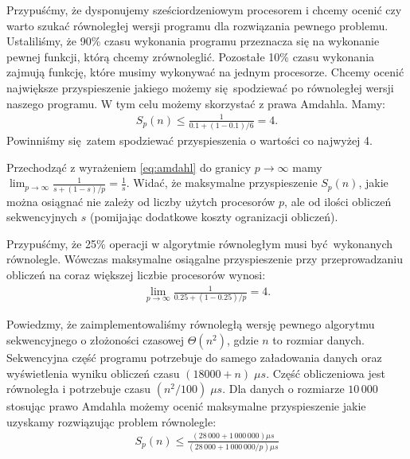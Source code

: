 \begin{przyklad}
Przypuśćmy, że dysponujemy sześciordzeniowym procesorem i chcemy ocenić czy warto szukać równoległej wersji programu dla rozwiązania pewnego problemu. Ustaliliśmy, że 90\% czasu wykonania programu przeznacza się na wykonanie pewnej funkcji, którą chcemy zrównoleglić. Pozostałe 10\% czasu wykonania zajmują funkcję, które musimy wykonywać na jednym procesorze. Chcemy ocenić największe przyspieszenie jakiego możemy się spodziewać po równoległej wersji naszego programu. W tym celu możemy skorzystać z prawa Amdahla. Mamy:
\begin{align*}
S_{p}(n) \leq \frac{1}{0.1 + (1-0.1)/6} = 4.
\end{align*}
\noindent Powinniśmy się zatem spodziewać przyspieszenia o wartości co najwyżej 4.
\end{przyklad}


\begin{wniosek}
Przechodząć z wyrażeniem \eqref{eq:amdahl} do granicy \(p\to\infty\) mamy \(\lim_{p\to\infty}\frac{1}{s+(1-s)/p} = \frac{1}{s}\). Widać, że maksymalne przyspieszenie \(S_{p}(n)\), jakie można osiągnać nie zależy od liczby użytch procesorów \(p\), ale od ilości obliczeń sekwencyjnych \(s\) (pomijając dodatkowe koszty ogranizacji obliczeń).
\end{wniosek}

\begin{przyklad}
Przypuśćmy, że 25\% operacji w algorytmie równoległym musi być wykonanych równolegle. Wówczas maksymalne osiągalne przyspieszenie przy przeprowadzaniu obliczeń na coraz większej liczbie procesorów wynosi:
\begin{align*}
\lim_{p\to \infty} \frac{1}{0.25+(1-0.25)/p} = 4.
\end{align*}
\end{przyklad}

\begin{przyklad}
Powiedzmy, że zaimplementowaliśmy równoległą wersję pewnego algorytmu sekwencyjnego o złożoności czasowej \(\Theta(n^2)\), gdzie \(n\) to rozmiar danych.
Sekwencyjna część programu potrzebuje do samego załadowania danych oraz wyświetlenia wyniku obliczeń czasu \((18000+n) \; \mu s\). Część obliczeniowa jest równoległa i potrzebuje czasu \((n^2/100)\;\mu s\). Dla danych o rozmiarze \(10\,000\) stosując prawo Amdahla możemy ocenić maksymalne przyspieszenie jakie uzyskamy rozwiązując problem równolegle:
\begin{align*}
S_{p}(n) \leq \frac{(28\,000 + 1\,000\,000) \mu s}{(28\,000 + 1\,000\,000/p) \mu s}
\end{align*}

\end{przyklad}
